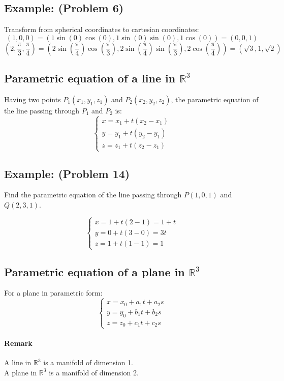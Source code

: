 \documentclass[11pt]{article}
\begin{document}
\subsection*{Example: (Problem 6)}
Transform from spherical coordinates to cartesian coordinates:
\[
(1,0,0) = (1 \sin(0) \cos(0), 1 \sin(0) \sin(0), 1 \cos(0)) = (0,0,1)
\]
\[
(2,\frac{\pi}{3},\frac{\pi}{4}) = (2 \sin(\frac{\pi}{4}) \cos(\frac{\pi}{3}), 2 \sin(\frac{\pi}{4}) \sin(\frac{\pi}{3}), 2 \cos(\frac{\pi}{4})) = (\sqrt{3}, 1, \sqrt{2})
\]

\subsection{Parametric equation of a line in $\mathbb{R}^3$}
Having two points $P_1(x_1, y_1, z_1)$ and $P_2(x_2, y_2, z_2)$, the parametric equation of the line passing through $P_1$ and $P_2$ is:
\[
\begin{cases}
x = x_1 + t(x_2 - x_1) \\
y = y_1 + t(y_2 - y_1) \\
z = z_1 + t(z_2 - z_1)
\end{cases}
\]

\subsection*{Example: (Problem 14)}
Find the parametric equation of the line passing through $P(1,0,1)$ and $Q(2,3, 1)$.

\[
\begin{cases}
x = 1 + t(2 - 1) = 1 + t \\
y = 0 + t(3 - 0) = 3t \\
z = 1 + t(1 - 1) = 1
\end{cases}
\]

\subsection{Parametric equation of a plane in $\mathbb{R}^3$}
For a plane in parametric form:
\[
\begin{cases}
x = x_0 + a_1 t + a_2 s \\
y = y_0 + b_1 t + b_2 s \\
z = z_0 + c_1 t + c_2 s
\end{cases}
\]

\paragraph{Remark}
A line in $\mathbb{R}^3$ is a manifold of dimension 1. \\
A plane in $\mathbb{R}^3$ is a manifold of dimension 2.
\end{document}
